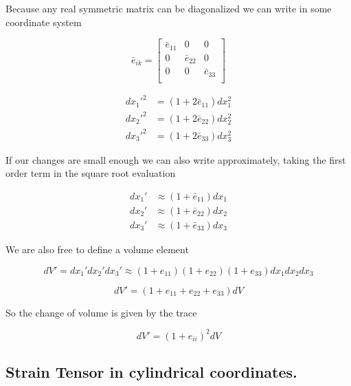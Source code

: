 Because any real symmetric matrix can be diagonalized we can write in some coordinate system

\begin{equation}\label{eqn:continuumL2:250}
\bar{e}_{ik} = 
\begin{bmatrix}
\bar{e}_{11} & 0 & 0 \\
0 & \bar{e}_{22} & 0 \\
0 & 0 & \bar{e}_{33} \\
\end{bmatrix}
\end{equation}

\begin{align}\label{eqn:continuumL2:270}
{dx_1'}^2 &= (1 + 2 \bar{e}_{11}) dx_1^2 \\
{dx_2'}^2 &= (1 + 2 \bar{e}_{22}) dx_2^2 \\
{dx_3'}^2 &= (1 + 2 \bar{e}_{33}) dx_3^2
\end{align}

If our changes are small enough we can also write approximately, taking the first order term in the square root evaluation

\begin{align}\label{eqn:continuumL2:290}
dx_1' &\approx (1 + \bar{e}_{11}) dx_1 \\
dx_2' &\approx (1 + \bar{e}_{22}) dx_2 \\
dx_3' &\approx (1 + \bar{e}_{33}) dx_3
\end{align}

We are also free to define a volume element

\begin{equation}\label{eqn:continuumL2:310}
dV' = 
dx_1'
dx_2'
dx_3'
\approx
(1 + e_{11})
(1 + e_{22})
(1 + e_{33})
dx_1 dx_2 dx_3
\end{equation}

\begin{equation}\label{eqn:continuumL2:330}
dV' = (1 + e_{11} +e_{22} +e_{33} ) dV
\end{equation}

So the change of volume is given by the trace

\begin{equation}\label{eqn:continuumL2:350}
dV' = ( 1 + e_{ii} )^2 dV
\end{equation}

\subsection{Strain Tensor in cylindrical coordinates.}

